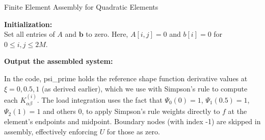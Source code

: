 \documentclass[a4paper,10pt]{article}
\begin{document}
\begin{algorithm}[H]
	\caption{Finite Element Assembly for Quadratic Elements}
	\label{alg:FEM_assembly}


	\BlankLine

	\textbf{Initialization:}\\
	Set all entries of \(A\) and \(\mathbf{b}\) to zero.
	Here, \(A[i,j] = 0\) and \(b[i] = 0\) for \(0 \le i,j \le 2M\).\;

	\BlankLine
	\BlankLine

	\textbf{Output the assembled system:}\\

\end{algorithm}

In the code, psi\_prime holds the reference shape function derivative values at \(\xi=0,0.5,1\) (as derived earlier), which we use with Simpson's rule to compute each \(K^{(i)}_{\alpha\beta}\).
The load integration uses the fact that \(\Psi_0(0)=1\), \(\Psi_1(0.5)=1\), \(\Psi_2(1)=1\) and others 0, to apply Simpson's rule weights directly to \(f\) at the element's endpoints and midpoint.
Boundary nodes (with index -1) are skipped in assembly, effectively enforcing \(U\) for those as zero.
\end{document}
